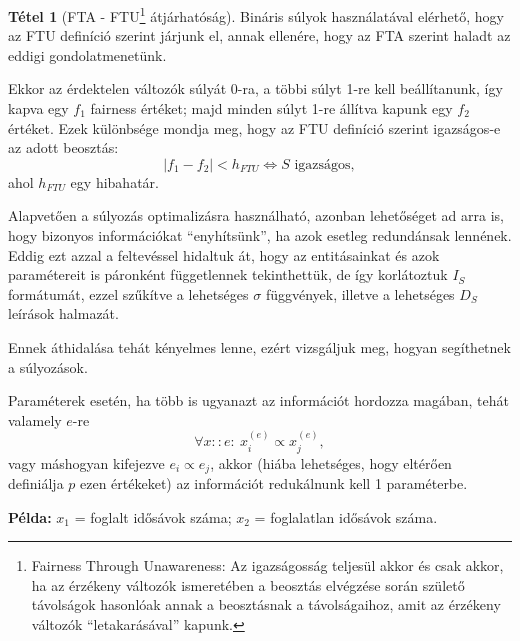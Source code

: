 \documentclass[twocolumn]{article}
\theoremstyle{definition}
\newtheorem{theorem}{Tétel}[section]
\newcommand{\pl}{ \textbf{Példa:} }
\newcommand{\ent}[2]{ {#1}^{(#2)} }
\begin{document}
    \begin{theorem}[FTA - FTU\footnote{Fairness Through Unawareness: Az igazságosság teljesül akkor és csak akkor, ha az érzékeny változók ismeretében a beosztás elvégzése során születő távolságok hasonlóak annak a beosztásnak a távolságaihoz, amit az érzékeny változók \enquote{letakarásával} kapunk. } átjárhatóság]
        Bináris súlyok használatával elérhető, hogy az FTU definíció szerint járjunk el, annak ellenére, hogy az FTA szerint haladt az eddigi gondolatmenetünk. 
        
        Ekkor az érdektelen változók súlyát 0-ra, a többi súlyt 1-re kell beállítanunk, így kapva egy $f_1$ fairness értéket; majd minden súlyt 1-re állítva kapunk egy $f_2$ értéket. Ezek különbsége mondja meg, hogy az FTU definíció szerint igazságos-e az adott beosztás:
        $$ |f_1 - f_2| < h_{FTU} \Leftrightarrow S \text{ igazságos}, $$
        ahol $h_{FTU}$ egy hibahatár.
    \end{theorem}
    
    Alapvetően a súlyozás optimalizásra használható, azonban lehetőséget ad arra is, hogy bizonyos információkat \enquote{enyhítsünk}, ha azok esetleg redundánsak lennének. Eddig ezt azzal a feltevéssel hidaltuk át, hogy az entitásainkat és azok paramétereit is páronként függetlennek tekinthettük, de így korlátoztuk $I_S$ formátumát, ezzel szűkítve a lehetséges $\sigma$ függvények, illetve a lehetséges $D_S$ leírások halmazát.
    
    Ennek áthidalása tehát kényelmes lenne, ezért vizsgáljuk meg, hogyan segíthetnek a súlyozások.

    Paraméterek esetén, ha több is ugyanazt az információt hordozza magában, tehát valamely $e$-re $$\forall x::e : \ \ent x e _i \propto \ent x e _j,$$ vagy máshogyan kifejezve $e_i \propto e_j$, akkor (hiába lehetséges, hogy eltérően definiálja $p$ ezen értékeket) az információt redukálnunk kell 1 paraméterbe.
    
    \pl $x_1$ = foglalt idősávok száma; $x_2$ = foglalatlan idősávok száma.
\end{document}
